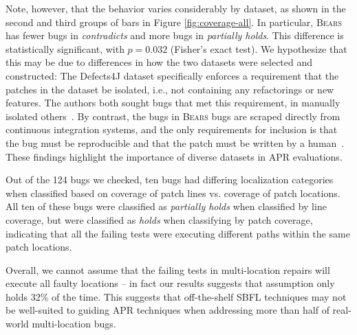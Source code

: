 \documentclass[10pt, conference]{IEEEtran}
\newcommand\bears{\textsc{Bears}\xspace}
\begin{document}
Note, however, that the behavior varies considerably by dataset, as shown in the second and 
third groups of bars in Figure \ref{fig:coverage-all}. In particular, \bears has fewer bugs in 
\emph{contradicts} and more bugs in \emph{partially holds}.
This difference is statistically significant, with $p = 0.032$ (Fisher's exact test).
We hypothesize that this may be due to differences in how the two  
datasets were selected and constructed:
The Defects4J dataset specifically enforces a requirement that the patches in the 
dataset be isolated, i.e., not containing any refactorings or new features.
The authors both sought bugs that met this requirement, in manually isolated others~\cite{defects4j}. By contrast, the 
bugs in 
\bears bugs are scraped directly from continuous integration systems, and the 
only requirements for inclusion is that the bug must be reproducible and that
the patch must be written by a human~\cite{bears}. 
These findings highlight the importance of diverse datasets
in APR evaluations. 

Out of the 124 bugs we checked, ten bugs had differing localization categories when 
classified based on coverage of patch lines vs. coverage of patch locations. All ten of these 
bugs 
were classified as \emph{partially holds} when classified by line coverage, but were classified as 
\emph{holds} when classifying by patch coverage, indicating that all the failing tests were 
executing different paths within the same patch locations. 

Overall, we cannot assume that the failing tests in multi-location repairs will execute all 
faulty locations -- in fact our results suggests that assumption only holds 32\% of the time. 
This suggests that off-the-shelf SBFL techniques may not be
well-suited to guiding APR techniques when addressing more than half of
real-world multi-location bugs.
\end{document}

